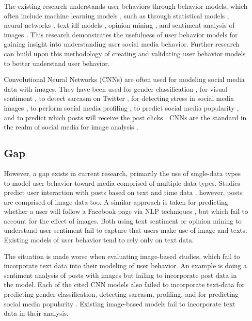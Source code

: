 \documentclass{article}
\begin{document}
The existing research understands user behaviors through behavior models, which often include machine learning models \cite{Li2015, 8029313, Ohsawa2013, Liu2012, Li2015}, such as through statistical models \cite{Li2015}, neural networks \cite{8029313}, text idf models \cite{Ohsawa2013}, opinion mining \cite{Liu2012}, and sentiment analysis of images \cite{Wang2015}. This research demonstrates the usefulness of user behavior models for gaining insight into understanding user social media behavior. Further research can build upon this methodology of creating and validating user behavior models to better understand user behavior.

Convolutional Neural Networks (CNNs) are often used for modeling social media data with images.  They have been used for gender classification \cite{Hassner2015}, for visual sentiment \cite{Segalin2017, Xu2014}, to detect sarcasm on Twitter \cite{Poria2016}, for detecting stress in social media images \cite{Lin2014}, to perform social media profiling \cite{Segalin2017}, to predict social media popularity \cite{Gelli2015}, and to predict which posts will receive the post clicks \cite{Khosla2014}. CNNs are the standard in the realm of social media for image analysis \cite{Hassner2015}. 

\subsection{Gap}

However, a gap exists in current research, primarily the use of single-data types to model user behavior toward media comprised of multiple data types. Studies predict user interaction with posts based on text and time data \cite{8029313}, however, posts are comprised of image data too. A similar approach is taken for predicting whether a user will follow a Facebook page via NLP techniques \cite{Ohsawa2013}, but which fail to account for the effect of images.  Both using text sentiment or opinion mining \cite{Liu2012} to understand user sentiment fail to capture that users make use of image and texts. Existing models of user behavior tend to rely only on text data.

The situation is made worse when evaluating image-based studies, which fail to incorporate text data into their modeling of user behavior. An example is doing a sentiment analysis of posts with images \cite{Wang2015} but failing to incorporate post data in the model. Each of the cited CNN models also failed to incorporate text-data for predicting gender classification, detecting sarcasm, profiling, and for predicting social media popularity \cite{Hassner2015, Poria2016, Segalin2017, Gelli2015}. Existing image-based models fail to incorporate text data in their analysis.
\end{document}
